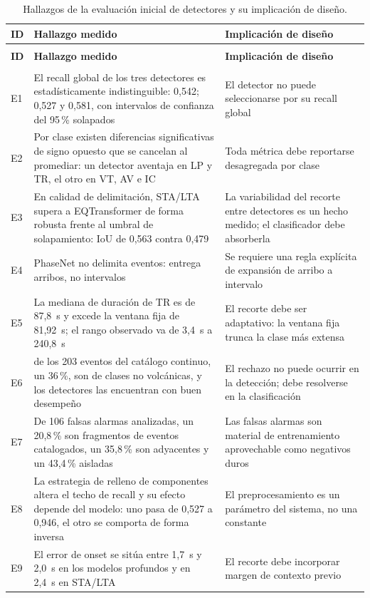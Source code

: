 {\small
\begin{longtable}{>{\raggedright\arraybackslash}p{0.9cm}>{\raggedright\arraybackslash}p{5.3cm}>{\raggedright\arraybackslash}p{5.3cm}}
\caption{Hallazgos de la evaluación inicial de detectores y su implicación de diseño.}\label{tab:evidencia}\\
\toprule
\textbf{ID} & \textbf{Hallazgo medido} & \textbf{Implicación de diseño} \\
\midrule
\endfirsthead
\multicolumn{3}{l}{\itshape Cuadro \thetable{} (continuación)}\\
\toprule
\textbf{ID} & \textbf{Hallazgo medido} & \textbf{Implicación de diseño} \\
\midrule
\endhead
\midrule
\multicolumn{3}{r}{\itshape Continúa en la página siguiente}\\
\endfoot
\bottomrule
\endlastfoot
E1 & El recall global de los tres detectores es estadísticamente indistinguible:
0,542; 0,527 y 0,581, con intervalos de confianza del 95\,\% solapados &
El detector no puede seleccionarse por su recall global \\
\addlinespace
E2 & Por clase existen diferencias significativas de signo opuesto que se cancelan
al promediar: un detector aventaja en LP y TR, el otro en VT, AV e IC &
Toda métrica debe reportarse desagregada por clase \\
\addlinespace
E3 & En calidad de delimitación, STA/LTA supera a EQTransformer de forma robusta
frente al umbral de solapamiento: IoU de 0,563 contra 0,479 &
La variabilidad del recorte entre detectores es un hecho medido; el clasificador
debe absorberla \\
\addlinespace
E4 & PhaseNet no delimita eventos: entrega arribos, no intervalos &
Se requiere una regla explícita de expansión de arribo a intervalo \\
\addlinespace
E5 & La mediana de duración de TR es de 87,8~s y excede la ventana fija de
81,92~s; el rango observado va de 3,4~s a 240,8~s &
El recorte debe ser adaptativo: la ventana fija trunca la clase más extensa \\
\addlinespace
E6 & 73 de los 203 eventos del catálogo continuo, un 36\,\%, son de clases no
volcánicas, y los detectores las encuentran con buen desempeño &
El rechazo no puede ocurrir en la detección; debe resolverse en la clasificación \\
\addlinespace
E7 & De 106 falsas alarmas analizadas, un 20,8\,\% son fragmentos de eventos
catalogados, un 35,8\,\% son adyacentes y un 43,4\,\% aisladas &
Las falsas alarmas son material de entrenamiento aprovechable como negativos
duros \\
\addlinespace
E8 & La estrategia de relleno de componentes altera el techo de recall y su efecto
depende del modelo: uno pasa de 0,527 a 0,946, el otro se comporta de forma
inversa &
El preprocesamiento es un parámetro del sistema, no una constante \\
\addlinespace
E9 & El error de onset se sitúa entre 1,7~s y 2,0~s en los modelos profundos y en
2,4~s en STA/LTA &
El recorte debe incorporar margen de contexto previo \\
\bottomrule
\end{longtable}
}


